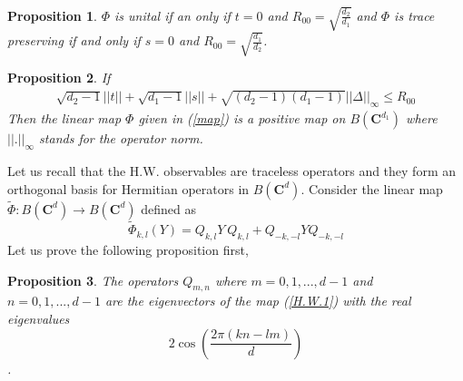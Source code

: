 \documentclass[12pt]{amsart}
\numberwithin{equation}{section}
\newtheorem{proposition}{Proposition}[section]
\begin{document}
\begin{proposition}\cite{Jannesary2025}\label{unital1}
   $\Phi$ is unital if an only if $t=0$ and $R_{00}=\sqrt{\frac{d_2}{d_1}}$ and $\Phi$ is trace preserving if and only if $s=0$ and $R_{00}=\sqrt{\frac{d_1}{d_2}}$.
\end{proposition}
\begin{proposition}\cite{Jannesary2025}{\label{positive}}
    If \begin{eqnarray*}
        \sqrt{d_2-1} \vert\vert t\vert\vert+\sqrt{d_1-1} \vert\vert s\vert\vert+\sqrt{(d_2-1)(d_1-1)}  \vert\vert \Delta\vert\vert_{\infty} \leq R_{00}
    \end{eqnarray*}
    Then the linear map $\Phi$ given in (\ref{map}) is a positive map on $B\left(\mathbf{C}^{d_1}\right)$ where $\vert\vert.\vert\vert_\infty$ stands for the operator norm.
\end{proposition}
 Let us recall that the H.W. observables are traceless operators and they form an orthogonal basis for Hermitian operators in $B\left(\mathbf{C}^{d}\right)$.
 Consider the linear map $\tilde{\Phi} : B\left(\mathbf{C}^d\right) \rightarrow B\left(\mathbf{C}^d\right)$ defined as 
\begin{equation} \label{H.W.1}
    \tilde{\Phi}_{k,l} (Y) =  Q_{k,l} Y~ Q_{k,l} + Q_{-k,-l} Y Q_{-k,-l}
\end{equation}
 Let us prove the following proposition first,

 \begin{proposition} \label{prop 7}
     The operators $Q_{m,n}$ where $m=0,1,...,d-1$ and $n=0,1,...,d-1$ are the eigenvectors of the map (\ref{H.W.1}) with the real eigenvalues
     \[2  \cos\left( \frac{ 2 \pi (kn-lm)}{d}\right) \].
      \end{proposition}
\end{document}
